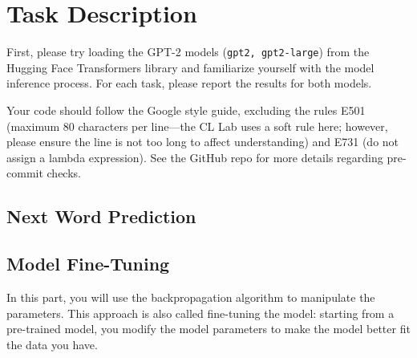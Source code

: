 \documentclass[12pt, letterpaper]{article}
\begin{document}
\section{Task Description}
First, please try loading the GPT-2 models (\texttt{gpt2, gpt2-large}) from the Hugging Face Transformers library and familiarize yourself with the model inference process.
For each task, please report the results for both models.

Your code should follow the Google style guide, excluding the rules E501 (maximum 80 characters per line---the CL Lab uses a soft rule here; however, please ensure the line is not too long to affect understanding) and E731 (do not assign a lambda expression).
See the GitHub repo for more details regarding pre-commit checks.

\subsection{Next Word Prediction}


\subsection{Model Fine-Tuning}
In this part, you will use the backpropagation algorithm to manipulate the parameters.
This approach is also called fine-tuning the model: starting from a pre-trained model, you modify the model parameters to make the model better fit the data you have.
\end{document}
